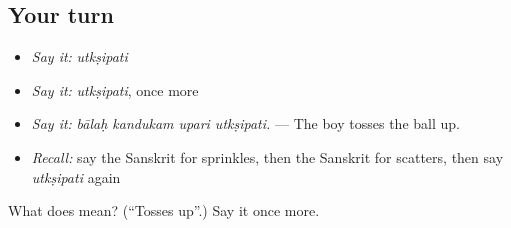 \subsection*{Your turn}
\begin{itemize}
\raggedright
  \item \emph{Say it:} \emph{utkṣipati}
  \item \emph{Say it:} \emph{utkṣipati}, once more
  \item \emph{Say it:} \emph{bālaḥ kandukam upari utkṣipati.} — The boy tosses the ball up.
  \item \emph{Recall:} say the Sanskrit for sprinkles, then the Sanskrit for scatters, then say \emph{utkṣipati} again
\end{itemize}

\begin{tcolorbox}[breakable,colback=teal!4,colframe=teal!35!black,title={Before you move on}]
What does  mean? (\textquotedblleft{}Tosses up\textquotedblright{}.) Say it once more.
\end{tcolorbox}
